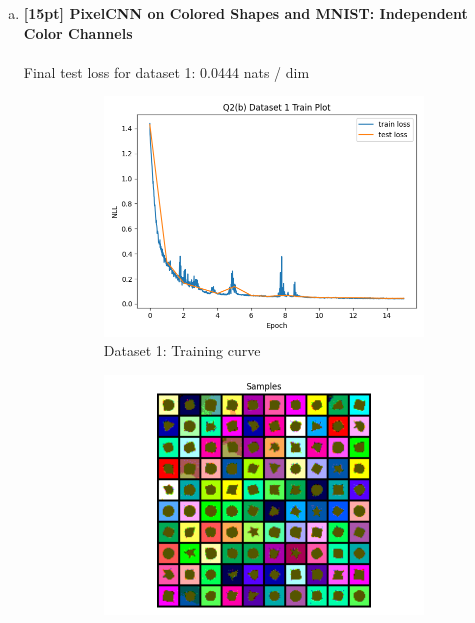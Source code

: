 \documentclass{article}
\begin{document}
\begin{enumerate}[(a)]
\newpage

\item {\bf [15pt] PixelCNN on Colored Shapes and MNIST: Independent Color Channels} \\\\
Final test loss for dataset 1: 0.0444 nats / dim
\begin{figure}[H]
    \centering
    \begin{subfigure}{0.45\textwidth}
        \centering
        \includegraphics[width=\textwidth]{figures/q2_b_dset1_train_plot.png}
        \caption{Dataset 1: Training curve}
    \end{subfigure}
    \hspace{0.2in}
    \begin{subfigure}{0.45\textwidth}
        \centering
        \includegraphics[width=\textwidth]{figures/q2_b_dset1_samples.png}

\end{subfigure}
\end{figure}
\end{enumerate}
\end{document}
